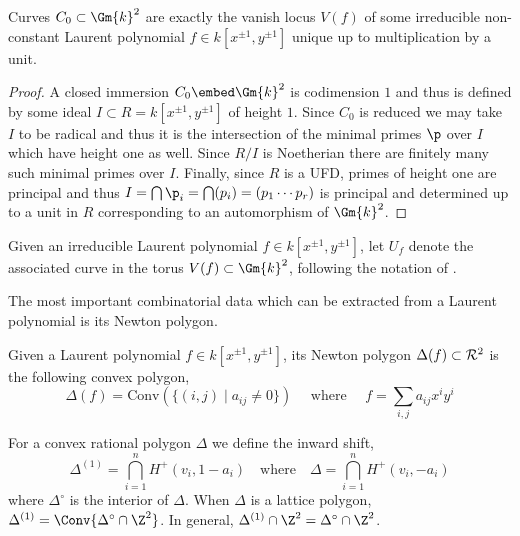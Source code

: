 \begin{prop}
Curves $C_0 \subset \Gm{k}^2$ are exactly the vanish locus $V(f)$ of some irreducible non-constant Laurent polynomial $f \in k[x^{\pm 1}, y^{\pm 1}]$ unique up to multiplication by a unit.
\end{prop}

\begin{proof}
A closed immersion $C_0 \embed \Gm{k}^2$ is codimension $1$ and thus is defined by some ideal $I \subset R = k[x^{\pm 1}, y^{\pm 1}]$ of height $1$. Since $C_0$ is reduced we may take $I$ to be radical and thus it is the intersection of the minimal primes $\p$ over $I$ which have height one as well. Since $R/I$ is Noetherian there are finitely many such minimal primes over $I$. Finally, since $R$ is a UFD, primes of height one are principal and thus $I = \bigcap \p_i = \bigcap (p_i) = (p_1 \cdots p_r)$ is principal and determined up to a unit in $R$ corresponding to an automorphism of $\Gm{k}^2$.
\end{proof}
\noindent
\begin{defn}
Given an irreducible Laurent polynomial $f \in k[x^{\pm 1}, y^{\pm 1}]$, let $U_f$ denote the associated curve in the torus $V(f) \subset \Gm{k}^2$, following the notation of \cite{WC_preface}.
\end{defn} 


\noindent
The most important combinatorial data which can be extracted from a Laurent polynomial is its Newton polygon.


\begin{defn}
Given a Laurent polynomial $f \in k[x^{\pm 1}, y^{\pm 1}]$, its Newton polygon $\Delta(f) \subset \mathcal{R}^2$ is the following convex polygon,
\begin{equation}
\Delta(f) = \mathrm{Conv} \left( \{ (i,j) \mid a_{ij} \neq 0 \} \right) \quad \text{ where } \quad f = \sum_{i,j} a_{ij} x^i y^i 
\end{equation}
\end{defn}

\begin{defn}
For a convex rational polygon $\Delta$ we define the inward shift,
\[ \Delta^{(1)} = \bigcap_{i = 1}^n H^+(v_i, 1 - a_i) \quad \text{where} \quad \Delta = \bigcap_{i = 1}^n H^+(v_i, -a_i) \]
where $\Delta^\circ$ is the interior of $\Delta$. When $\Delta$ is a lattice polygon, $\Delta^{(1)} = \Conv{\Delta^\circ \cap \Z^2}$. In general, $\Delta^{(1)} \cap \Z^2 = \Delta^\circ \cap \Z^2$.
\end{defn}

